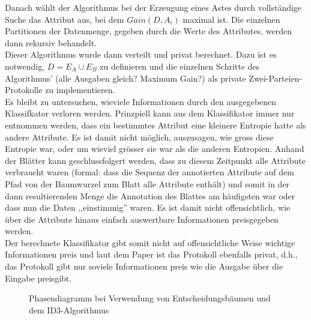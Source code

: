 \documentclass{article}
\theoremstyle{definition}
\theoremstyle{remark}
\begin{document}
Danach w\"ahlt der Algorithmus bei der Erzeugung eines Astes durch 
vollst\"andige Suche das Attribut aus, bei dem \(Gain(D, A_i)\) maximal ist. Die
einzelnen Partitionen der Datenmenge, gegeben durch die Werte des Attributes,
werden dann rekursiv behandelt.\\
Dieser Algorithmus wurde dann verteilt und privat berechnet. Dazu ist es 
notwendig, \(D = E_A \cup E_B\) zu definieren und die einzelnen
Schritte des Algorithmus' (alle Ausgaben gleich?
Maximum Gain?) als private Zwei-Parteien-Protokolle zu implementieren. \\
Es bleibt zu untersuchen, wieviele Informationen durch den ausgegebenen
Klassifkator verloren werden. Prinzpiell kann aus dem Klassifikator immer
nur entnommen werden, dass ein bestimmtes Attribut eine kleinere Entropie hatte
als andere Attribute. Es ist damit nicht m\"oglich, auszusagen, wie gross diese
Entropie war, oder um wieviel gr\"osser sie war als die anderen Entropien.
Anhand der Bl\"atter kann geschlussfolgert werden, dass zu diesem Zeitpunkt
alle Attribute verbraucht waren (formal: dass die Sequenz der annotierten
Attribute auf dem Pfad von der Baumwurzel zum Blatt alle Attribute enth\"alt)
und somit in der dann resultierenden Menge die Annotation des Blattes am
h\"aufigsten war oder dass nun die Daten ,,einstimmig'' waren. Es ist damit
nicht offensichtlich, wie \"uber die Attribute hinaus einfach auswertbare
Informationen preisgegeben werden.\\
Der berechnete Klassifikator gibt somit nicht auf offensichtliche Weise wichtige
Informationen preis und laut dem Paper ist das Protokoll ebenfalls privat,
d.h., das Protokoll gibt nur soviele Informationen preis wie die Ausgabe
\"uber die Eingabe preisgibt.\\
\begin{figure}
\caption{Phasendiagramm bei Verwendung von Entscheidungsb\"aumen und dem ID3-Algorithmus}
\label{fig:phase:id3}
\end{figure}
\end{document}
